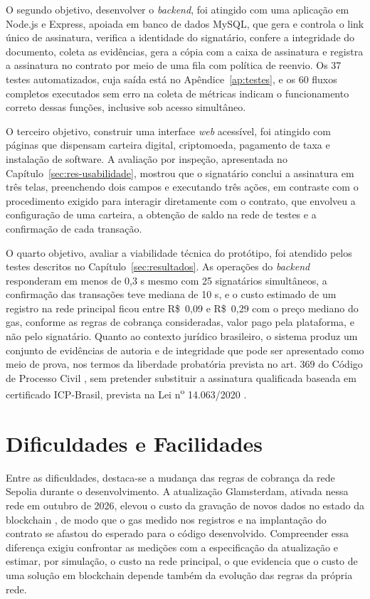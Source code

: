 \documentclass[
    12pt,
    a4paper,
    oneside,
    chapter=TITLE,
    section=TITLE,
    subsection=TITLE,
    subsubsection=TITLE,
    sumario=tradicional,
    english,
    brazil
]{abntex2}
\begin{document}
O segundo objetivo, desenvolver o \emph{backend}, foi atingido com uma aplicação em Node.js e Express, apoiada em banco de dados MySQL, que gera e controla o link único de assinatura, verifica a identidade do signatário, confere a integridade do documento, coleta as evidências, gera a cópia com a caixa de assinatura e registra a assinatura no contrato por meio de uma fila com política de reenvio. Os 37 testes automatizados, cuja saída está no Apêndice~\ref{ap:testes}, e os 60 fluxos completos executados sem erro na coleta de métricas indicam o funcionamento correto dessas funções, inclusive sob acesso simultâneo.

O terceiro objetivo, construir uma interface \emph{web} acessível, foi atingido com páginas que dispensam carteira digital, criptomoeda, pagamento de taxa e instalação de software. A avaliação por inspeção, apresentada no Capítulo~\ref{sec:res-usabilidade}, mostrou que o signatário conclui a assinatura em três telas, preenchendo dois campos e executando três ações, em contraste com o procedimento exigido para interagir diretamente com o contrato, que envolveu a configuração de uma carteira, a obtenção de saldo na rede de testes e a confirmação de cada transação.

O quarto objetivo, avaliar a viabilidade técnica do protótipo, foi atendido pelos testes descritos no Capítulo~\ref{sec:resultados}. As operações do \emph{backend} responderam em menos de 0,3 s mesmo com 25 signatários simultâneos, a confirmação das transações teve mediana de 10 s, e o custo estimado de um registro na rede principal ficou entre R\$~0,09 e R\$~0,29 com o preço mediano do gas, conforme as regras de cobrança consideradas, valor pago pela plataforma, e não pelo signatário. Quanto ao contexto jurídico brasileiro, o sistema produz um conjunto de evidências de autoria e de integridade que pode ser apresentado como meio de prova, nos termos da liberdade probatória prevista no art. 369 do Código de Processo Civil \cite{brasil2015}, sem pretender substituir a assinatura qualificada baseada em certificado ICP-Brasil, prevista na Lei n\textsuperscript{o} 14.063/2020 \cite{brasil2020}.

\section{Dificuldades e Facilidades}

Entre as dificuldades, destaca-se a mudança das regras de cobrança da rede Sepolia durante o desenvolvimento. A atualização Glamsterdam, ativada nessa rede em outubro de 2026, elevou o custo da gravação de novos dados no estado da blockchain \cite{beiko2024, silva2025}, de modo que o gas medido nos registros e na implantação do contrato se afastou do esperado para o código desenvolvido. Compreender essa diferença exigiu confrontar as medições com a especificação da atualização e estimar, por simulação, o custo na rede principal, o que evidencia que o custo de uma solução em blockchain depende também da evolução das regras da própria rede.
\end{document}
